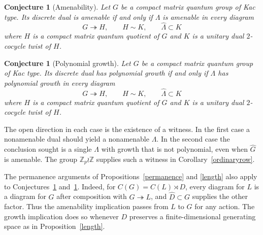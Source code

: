 \documentclass[11pt,a4paper]{article}
\newtheorem{conjecture}[thm]{Conjecture}
\theoremstyle{remark}
\begin{document}
\begin{conjecture}[Amenability]\label{twistamen}
Let $G$ be a compact matrix quantum group of Kac type. Its discrete
dual is amenable if and only if $\Lambda$ is amenable in every diagram
\[
 G\twoheadrightarrow H,\qquad H\sim K,\qquad \widehat\Lambda\subset K
\]
where $H$ is a compact matrix quantum quotient of $G$ and $K$ is a
unitary dual $2$-cocycle twist of $H$.
\end{conjecture}

\begin{conjecture}[Polynomial growth]\label{twistgrowth}
Let $G$ be a compact matrix quantum group of Kac type. Its discrete
dual has polynomial growth if and only if $\Lambda$ has polynomial
growth in every diagram
\[
 G\twoheadrightarrow H,\qquad H\sim K,\qquad \widehat\Lambda\subset K
\]
where $H$ is a compact matrix quantum quotient of $G$ and $K$ is a
unitary dual $2$-cocycle twist of $H$.
\end{conjecture}

The open direction in each case is the existence of a witness. In the
first case a nonamenable dual should yield a nonamenable $\Lambda$. In
the second case the conclusion sought is a single $\Lambda$ with growth
that is not polynomial, even when $\widehat G$ is amenable. The group
$\mathbb Z_p\wr\mathbb Z$ supplies such a witness in Corollary~\ref{ordinaryrow}.

The permanence arguments of Propositions~\ref{permanence} and
\ref{length} also apply to Conjectures~\ref{twistamen} and~\ref{twistgrowth}. Indeed, for
$C(G)=C(L)\rtimes D$, every diagram for $L$ is a diagram for $G$
after composition with $G\twoheadrightarrow L$, and $\widehat D\subset G$
supplies the other factor. Thus the amenability implication passes from
$L$ to $G$ for any action. The growth implication does so whenever $D$
preserves a finite-dimensional generating space as in Proposition~\ref{length}.
\end{document}

